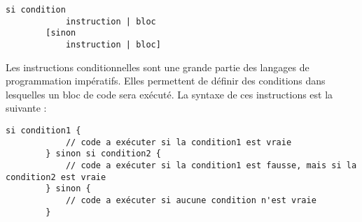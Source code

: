 \documentclass[../userguide.tex]{subfiles}
\begin{document}
    \begin{lstlisting}[label=lst:conditions-syntaxe]
        si condition
            instruction | bloc
        [sinon
            instruction | bloc]
    \end{lstlisting}
    \divider

    Les instructions conditionnelles sont une grande partie des langages de programmation impératifs.
    Elles permettent de définir des conditions dans lesquelles un bloc de code sera exécuté.
    La syntaxe de ces instructions est la suivante :
    \begin{lstlisting}[label=lst:conditions-ex-1]
        si condition1 {
            // code a exécuter si la condition1 est vraie
        } sinon si condition2 {
            // code a exécuter si la condition1 est fausse, mais si la condition2 est vraie
        } sinon {
            // code a exécuter si aucune condition n'est vraie
        }
    \end{lstlisting}
\end{document}
